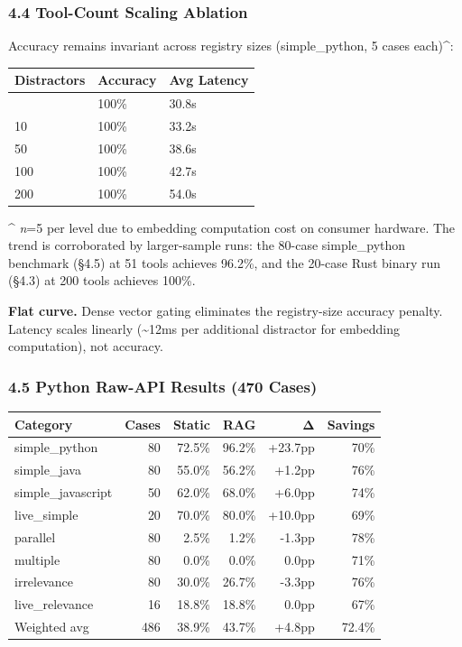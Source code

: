 \documentclass[
  10pt,
]{article}
\begin{document}
\subsubsection{4.4 Tool-Count Scaling
Ablation}\label{tool-count-scaling-ablation}

Accuracy remains invariant across registry sizes (simple\_python, 5
cases each)\^{}:

\begin{longtable}[]{@{}lll@{}}
\toprule\noalign{}
Distractors & Accuracy & Avg Latency \\
\midrule\noalign{}
\endhead
\bottomrule\noalign{}
\endlastfoot
0 & 100\% & 30.8s \\
10 & 100\% & 33.2s \\
50 & 100\% & 38.6s \\
100 & 100\% & 42.7s \\
200 & 100\% & 54.0s \\
\end{longtable}

\^{} \emph{n}=5 per level due to embedding computation cost on consumer
hardware. The trend is corroborated by larger-sample runs: the 80-case
simple\_python benchmark (§4.5) at 51 tools achieves 96.2\%, and the
20-case Rust binary run (§4.3) at 200 tools achieves 100\%.

\textbf{Flat curve.} Dense vector gating eliminates the registry-size
accuracy penalty. Latency scales linearly (\textasciitilde12ms per
additional distractor for embedding computation), not accuracy.

\subsubsection{4.5 Python Raw-API Results (470
Cases)}\label{python-raw-api-results-470-cases}

\begin{longtable}[]{@{}lrrrrr@{}}
\toprule\noalign{}
Category & Cases & Static & RAG & Δ & Savings \\
\midrule\noalign{}
\endhead
\bottomrule\noalign{}
\endlastfoot
simple\_python & 80 & 72.5\% & 96.2\% & +23.7pp & 70\% \\
simple\_java & 80 & 55.0\% & 56.2\% & +1.2pp & 76\% \\
simple\_javascript & 50 & 62.0\% & 68.0\% & +6.0pp & 74\% \\
live\_simple & 20 & 70.0\% & 80.0\% & +10.0pp & 69\% \\
parallel & 80 & 2.5\% & 1.2\% & -1.3pp & 78\% \\
multiple & 80 & 0.0\% & 0.0\% & 0.0pp & 71\% \\
irrelevance & 80 & 30.0\% & 26.7\% & -3.3pp & 76\% \\
live\_relevance & 16 & 18.8\% & 18.8\% & 0.0pp & 67\% \\
Weighted avg & 486 & 38.9\% & 43.7\% & +4.8pp & 72.4\% \\
\end{longtable}
\end{document}
